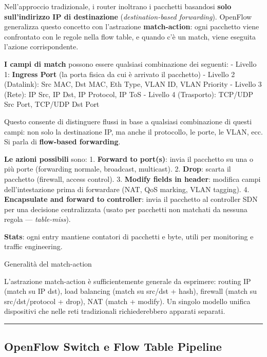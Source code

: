 \documentclass[
  italian,
  openany]{book}
\begin{document}
Nell'approccio tradizionale, i router inoltrano i pacchetti basandosi
\textbf{solo sull'indirizzo IP di destinazione} (\emph{destination-based
forwarding}). OpenFlow generalizza questo concetto con l'astrazione
\textbf{match-action}: ogni pacchetto viene confrontato con le regole
nella flow table, e quando c'è un match, viene eseguita l'azione
corrispondente.

\textbf{I campi di match} possono essere qualsiasi combinazione dei
seguenti: - Livello 1: \textbf{Ingress Port} (la porta fisica da cui è
arrivato il pacchetto) - Livello 2 (Datalink): Src MAC, Dst MAC, Eth
Type, VLAN ID, VLAN Priority - Livello 3 (Rete): IP Src, IP Dst, IP
Protocol, IP ToS - Livello 4 (Trasporto): TCP/UDP Src Port, TCP/UDP Dst
Port

Questo consente di distinguere flussi in base a qualsiasi combinazione
di questi campi: non solo la destinazione IP, ma anche il protocollo, le
porte, le VLAN, ecc. Si parla di \textbf{flow-based forwarding}.

\textbf{Le azioni possibili} sono: 1. \textbf{Forward to port(s)}: invia
il pacchetto su una o più porte (forwarding normale, broadcast,
multicast). 2. \textbf{Drop}: scarta il pacchetto (firewall, access
control). 3. \textbf{Modify fields in header}: modifica campi
dell'intestazione prima di forwardare (NAT, QoS marking, VLAN tagging).
4. \textbf{Encapsulate and forward to controller}: invia il pacchetto al
controller SDN per una decisione centralizzata (usato per pacchetti non
matchati da nessuna regola --- \emph{table-miss}).

\textbf{Stats}: ogni entry mantiene contatori di pacchetti e byte, utili
per monitoring e traffic engineering.

\begin{callouttip}{Generalità del match-action}

L'astrazione match-action è sufficientemente generale da esprimere:
routing IP (match su IP dst), load balancing (match su src/dst + hash),
firewall (match su src/dst/protocol + drop), NAT (match + modify). Un
singolo modello unifica dispositivi che nelle reti tradizionali
richiederebbero apparati separati.

\end{callouttip}

\begin{center}\rule{0.5\linewidth}{0.5pt}\end{center}

\subsection{OpenFlow Switch e Flow Table
Pipeline}\label{openflow-switch-e-flow-table-pipeline}
\end{document}
